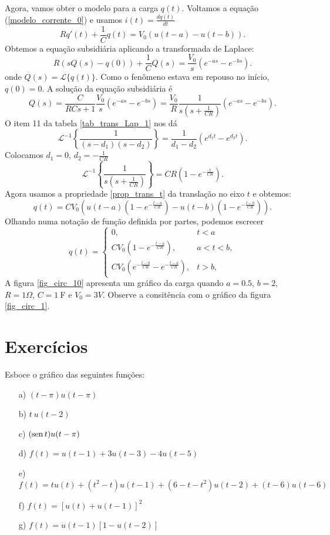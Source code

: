Agora, vamos obter o modelo para a carga $q(t)$. Voltamos a equação (\ref{modelo_corrente_0}) e usamos $i(t)=\frac{dq(t)}{dt}$
$$
 Rq'(t)+\frac{1}{C}q(t)=V_0\left(u(t-a)-u(t-b)\right).
$$
Obtemos a equação subsidiária aplicando a transformada de Laplace:
\begin{equation*}
  R\left(sQ(s)-q(0)\right)+\frac{1}{C}Q(s)=\frac{V_0}{s}\left(e^{-as}-e^{-bs}\right).
\end{equation*}
onde $Q(s)=\mathcal{L}\{q(t)\}$. Como o fenômeno estava em repouso no início, $q(0)=0$. A solução da equação subsidiária é
$$
Q(s)=\frac{C}{RCs+1}\frac{V_0}{s}\left(e^{-as}-e^{-bs}\right)=\frac{V_0}{R}\frac{1}{s\left(s+\frac{1}{CR}\right)}\left(e^{-as}-e^{-bs}\right).
$$
O item 11 da tabela \ref{tab_trans_Lap_1} nos dá 
$$
\mathcal{L}^{-1}\left\{\frac{1}{(s-d_1)(s-d_2)}\right\}=\frac{1}{d_1-d_2}\left(e^{d_1t}-e^{d_2t}\right).
$$
Colocamos $d_1=0$, $d_2=-\frac{1}{CR}$ 
$$
\mathcal{L}^{-1}\left\{\frac{1}{s\left(s+\frac{1}{CR}\right)}\right\}=CR\left(1-e^{-\frac{t}{CR}}\right).
$$
Agora usamos a propriedade \ref{prop_trans_t} da translação no eixo $t$ e obtemos:
$$
q(t)=CV_0\left(u(t-a)\left(1-e^{-\frac{t-a}{CR}}\right)-u(t-b)\left(1-e^{-\frac{t-b}{CR}}\right) \right).
$$
Olhando numa notação de função definida por partes, podemos escrecer
$$
q(t)=\left\{\begin{array}{ll}0,&t<a  \\ CV_0\left(1-e^{-\frac{t-a}{CR}}\right), &a<t<b, \\ CV_0\left(e^{-\frac{t-b}{CR}}-e^{-\frac{t-a}{CR}} \right), &t>b, \end{array}\right.
$$
A figura \ref{fig_circ_10} apresenta um gráfico da carga quando $a=0.5$, $b=2$, $R=1\Omega$, $C=1\ \!$F e $V_0=3V$. Observe a consitência com o gráfico da figura \ref{fig_circ_1}.

\section*{Exercícios}
\begin{Exercise}{\label{ex_Heaviside0}}Esboce o gráfico das seguintes funções:
\begin{itemize}
 \item [a)] $\displaystyle (t-\pi)u(t-\pi)$
 \item [b)] $\displaystyle t \ u(t-2)$
 \item [c)] $\displaystyle (\operatorname{sen} t) u(t-\pi)$
 \item [d)] $f(t)=u(t-1)+3u(t-3)-4u(t-5)$ 
 \item [e)] $f(t)=tu(t)+(t^2-t)u(t-1)+(6-t-t^2)u(t-2)+(t-6)u(t-6)$
 \item [f)] $f(t)=\left[u(t)+u(t-1)\right]^2$
 \item [g)] $f(t)=u(t-1)\left[1-u(t-2)\right] $
\end{itemize}

\end{Exercise}

